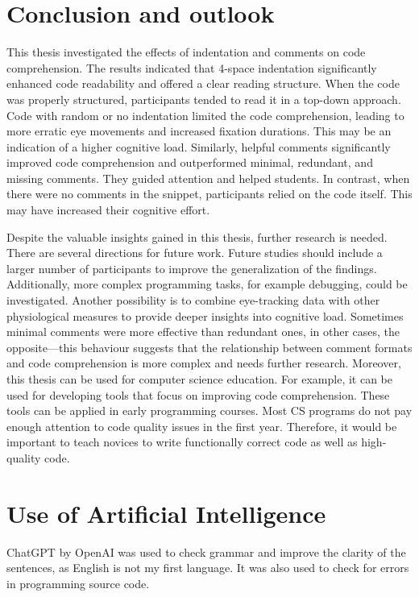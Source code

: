 \chapter{Conclusion and outlook}
\label{sec:conclusion}

This thesis investigated the effects of indentation and comments on code comprehension. The results indicated that 4-space indentation significantly enhanced code readability and offered a clear reading structure. When the code was properly structured, participants tended to read it in a top-down approach. Code with random or no indentation limited the code comprehension, leading to more erratic eye movements and increased fixation durations. This may be an indication of a higher cognitive load.  Similarly, helpful comments significantly improved code comprehension and outperformed minimal, redundant, and missing comments.  They guided attention and helped students. In contrast, when there were no comments in the snippet, participants relied on the code itself. This may have increased their cognitive effort.
 
Despite the valuable insights gained in this thesis, further research is needed. There are several directions for future work.  Future studies should include a larger number of participants to improve the generalization of the findings. Additionally, more complex programming tasks, for example debugging, could be investigated. Another possibility is to combine eye-tracking data with other physiological measures to provide deeper insights into cognitive load. Sometimes minimal comments were more effective than redundant ones, in other cases, the opposite—this behaviour suggests that the relationship between comment formats and code comprehension is more complex and needs further research.  Moreover, this thesis can be used for computer science education. For example, it can be used for developing tools that focus on improving code comprehension. These tools can be applied in early programming courses. Most CS programs do not pay enough attention to code quality issues in the first year. Therefore, it would be important to teach novices to write functionally correct code as well as high-quality code.   


\chapter{Use of Artificial Intelligence}
\label{sec:ai}

ChatGPT by OpenAI was used to check grammar and improve the clarity of the sentences, as English is not my first language. It was also used to check for errors in programming source code. 
